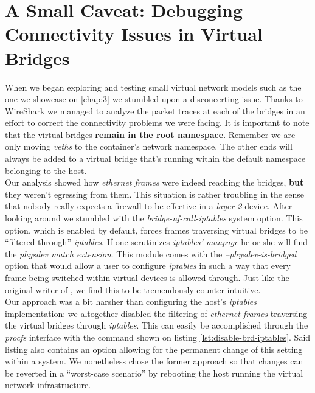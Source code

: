     \section{A Small Caveat: Debugging Connectivity Issues in Virtual Bridges} \label{sec:bridge-caveats}
        When we began exploring and testing small virtual network models such as the one we showcase on \ref{chap:3} we stumbled upon a disconcerting issue. Thanks to WireShark \cite{bib:wireshark} we managed to analyze the packet traces at each of the bridges in an effort to correct the connectivity problems we were facing. It is important to note that the virtual bridges \textbf{remain in the root namespace}. Remember we are only moving \textit{veths} to the container's network namespace. The other ends will always be added to a virtual bridge that's running within the default namespace belonging to the host.\\

        Our analysis showed how \textit{ethernet frames} were indeed reaching the bridges, \textbf{but} they weren't egressing from them. This situation is rather troubling in the sense that nobody really expects a firewall to be effective in a \textit{layer 2} device. After looking around we stumbled with the \textit{\allowbreak bridge-nf-call-iptables} system option. This option, which is enabled by default, forces frames traversing virtual bridges to be ``filtered through'' \textit{iptables}. If one scrutinizes \textit{iptables' manpage} he or she will find the \textit{physdev match extension}. This module comes with the \textit{--physdev-is-bridged} option that would allow a user to configure \textit{iptables} in such a way that every frame being switched within virtual devices is allowed through. Just like the original writer of \cite{bib:brd-iptables-calls}, we find this to be tremendously counter intuitive.\\

        Our approach was a bit harsher than configuring the host's \textit{iptables} implementation: we altogether disabled the filtering of \textit{ethernet frames} traversing the virtual bridges through \textit{iptables}. This can easily be accomplished through the \textit{procfs} interface with the command shown on listing \ref{lst:disable-brd-iptables}. Said listing also contains an option allowing for the permanent change of this setting within a system. We nonetheless chose the former approach so that changes can be reverted in a ``worst-case scenario'' by rebooting the host running the virtual network infrastructure.\\

